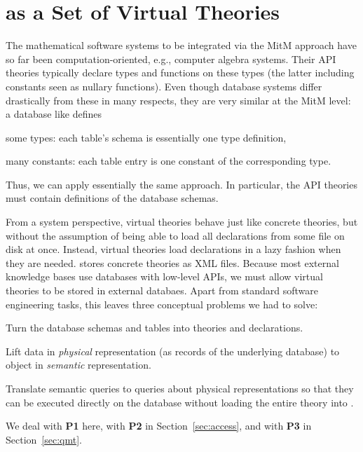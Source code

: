 \section{\lmfdb as a Set of Virtual Theories}\label{sec:vt}

The mathematical software systems to be integrated via the MitM approach have so far been computation-oriented, e.g., computer algebra systems.
Their API theories typically declare types and functions on these types (the latter including constants seen as nullary functions).
Even though database systems differ drastically from these in many respects, they are very similar at the MitM level: a database like \lmfdb defines
\begin{compactitem}
 \item some types: each table's schema is essentially one type definition,
 \item many constants: each table entry is one constant of the corresponding type.
\end{compactitem}
Thus, we can apply essentially the same approach.
In particular, the API theories must contain definitions of the database schemas. 

From a system perspective, virtual theories behave just like concrete theories, but without the assumption of being able to load all declarations from some file on disk at once.
Instead, virtual theories load declarations in a lazy fashion when they are needed. 
\mmt stores concrete theories as XML files.
Because most external knowledge bases use databases with low-level APIs, we must allow virtual theories to be stored in external databaes.
Apart from standard software engineering tasks, this leaves three conceptual problems we had to solve:
\begin{compactenum}[\bf P1]
\item Turn the database schemas and tables into \ommt theories and declarations. 
\item Lift data in \emph{physical} representation (as records of the
  underlying database) to \ommt object in \emph{semantic} representation.
\item Translate semantic queries to queries about physical representations so
  that they can be executed directly on the database without loading the entire theory into
  \mmt.
\end{compactenum}
We deal with \textbf{P1} here, with \textbf{P2} in Section~\ref{sec:access}, and with \textbf{P3} in Section~\ref{sec:qmt}. 

